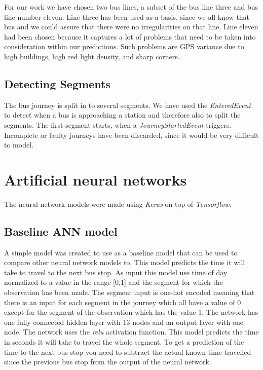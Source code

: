 For our work we have chosen two bus lines, a subset of the bus line three and bus line number eleven. Line three has been used as a basis, since we all know that bus and we could assure that there were no irregularities on that line. Line eleven had been chosen because it captures a lot of problems that need to be taken into consideration within our predictions. Such problems are GPS variance due to high buildings, high red light density, and sharp corners. 

\subsection{Detecting Segments}
The bus journey is split in to several segments. We have used the \textit{EnteredEvent} to detect when a bus is approaching a station and therefore also to split the segments. The first segment starts, when a \textit{JourneyStartedEvent} triggers. Incomplete or faulty journeys have been discarded, since it would be very difficult to model.

\section{Artificial neural networks}
The neural network models were made using \textit{Keras} on top of \textit{Tensorflow}.

\subsection{Baseline ANN model}
A simple model was created to use as a baseline model that can be used to compare other neural network models to. This model predicts the time it will take to travel to the next bus stop. As input this model use time of day normalized to a value in the range [0,1] and the segment for which the observation has been made. The segment input is one-hot encoded meaning that there is an input for each segment in the journey which all have a value of 0 except for the segment of the observation which has the value 1. The network has one fully connected hidden layer with 13 nodes and an output layer with one node. The network uses the \textit{relu} activation function.
This model predicts the time in seconds it will take to travel the whole segment. To get a prediction of the time to the next bus stop you need to subtract the actual known time travelled since the previous bus stop from the output of the neural network.

